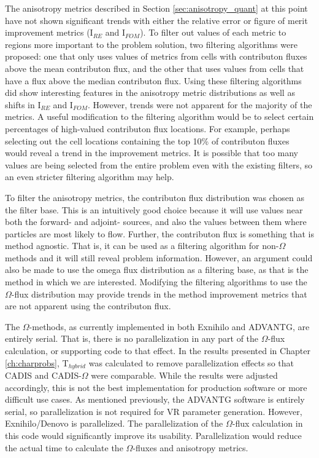 The anisotropy metrics described in Section \ref{sec:anisotropy_quant} at this
point have not shown significant trends with either the relative error or figure
of merit improvement metrics (I$_{RE}$ and I$_{FOM}$). To filter out values of
each metric to regions more important to the problem solution, two filtering
algorithms were proposed: one that only uses values of metrics from cells with
contributon fluxes above the mean contributon flux, and the other that uses
values from cells that have a flux above the median contributon flux. Using
these filtering algorithms did show interesting features in the anisotropy
metric distributions as well as shifts in I$_{RE}$ and I$_{FOM}$. However,
trends were not apparent for the majority of the metrics.
A useful modification
to the filtering algorithm would be to select certain percentages of high-valued
contributon flux locations. For example, perhaps selecting out the cell locations
containing the top 10\% of contributon fluxes would reveal a trend in the
improvement metrics.
It is possible that too many values are being
selected from the entire problem even with the existing filters, so an even
stricter filtering algorithm may help.

To filter the anisotropy metrics, the contributon flux distribution was chosen
as the filter base. This is an intuitively good choice
because it will use values near both
the forward- and adjoint- sources, and also the values between them where
particles are most likely to flow. Further, the contributon flux is something
that is method agnostic. That is, it can be used as a filtering
algorithm for non-$\Omega$ methods and it will still reveal problem information.
However, an argument could also be made to
use the omega flux distribution as a filtering base, as that is the method in
which we are interested. Modifying the filtering algorithms to use the
$\Omega$-flux distribution may provide trends in the method
improvement metrics that are not apparent using the contributon flux.

The $\Omega$-methods, as currently implemented in both Exnihilo and ADVANTG, are
entirely serial. That is, there is no parallelization in any part of the
$\Omega$-flux calculation, or supporting code to that effect. In the results
presented in Chapter \ref{ch:charprobs}, T$_{hybrid}$ was calculated to remove
parallelization effects so that CADIS and CADIS-$\Omega$ were comparable. While
the results were adjusted accordingly, this is not the best implementation for
production software or more difficult use cases. As mentioned previously, the
ADVANTG software is entirely serial, so parallelization is not required for
VR parameter generation. However, Exnihilo/Denovo is parallelized. The
parallelization of the $\Omega$-flux calculation in this code
would significantly improve its
usability. Parallelization would reduce the actual time to calculate the
$\Omega$-fluxes and anisotropy metrics.

